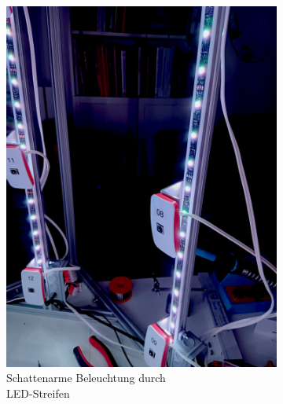 \documentclass[./00PhotoBox.tex]{subfiles}
\begin{document}
\begin{figure}[htbp]
    \centering
    \begin{subfigure}{0.45\textwidth}
        \includegraphics[height=1.2\linewidth]{./img/3_aufbau/beleuchtung.jpg}
        \centering
        \caption{Schattenarme Beleuchtung durch \\LED-Streifen}
        \label{img:led_streifen}
    \end{subfigure}
    \begin{subfigure}{0.45\textwidth}

\end{subfigure}
\end{figure}
\end{document}
